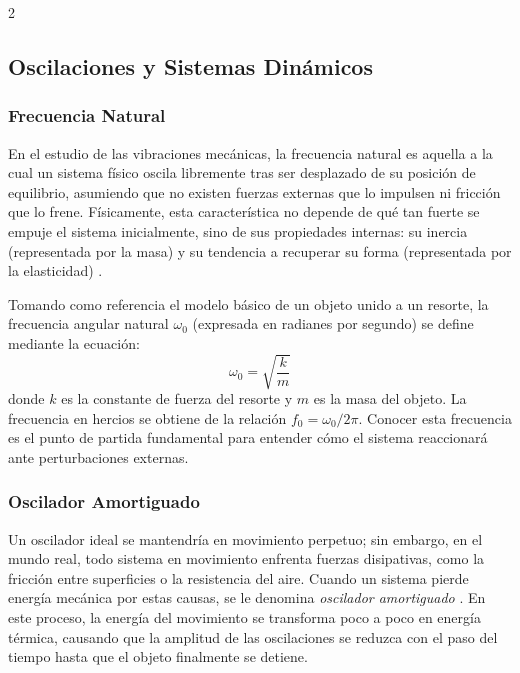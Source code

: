 \documentclass[10pt]{article}
\begin{document}
\begin{multicols}{2}
\subsection{Oscilaciones y Sistemas Dinámicos}

\subsubsection{Frecuencia Natural}
En el estudio de las vibraciones mecánicas, la frecuencia natural es aquella a la cual un sistema físico oscila libremente tras ser desplazado de su posición de equilibrio, asumiendo que no existen fuerzas externas que lo impulsen ni fricción que lo frene. Físicamente, esta característica no depende de qué tan fuerte se empuje el sistema inicialmente, sino de sus propiedades internas: su inercia (representada por la masa) y su tendencia a recuperar su forma (representada por la elasticidad) \cite{sears_zemansky}.

Tomando como referencia el modelo básico de un objeto unido a un resorte, la frecuencia angular natural $\omega_0$ (expresada en radianes por segundo) se define mediante la ecuación:
\begin{equation}
    \omega_0 = \sqrt{\frac{k}{m}}
\end{equation}
donde $k$ es la constante de fuerza del resorte y $m$ es la masa del objeto. La frecuencia en hercios se obtiene de la relación $f_0 = \omega_0 / 2\pi$. Conocer esta frecuencia es el punto de partida fundamental para entender cómo el sistema reaccionará ante perturbaciones externas.

\subsubsection{Oscilador Amortiguado}
Un oscilador ideal se mantendría en movimiento perpetuo; sin embargo, en el mundo real, todo sistema en movimiento enfrenta fuerzas disipativas, como la fricción entre superficies o la resistencia del aire. Cuando un sistema pierde energía mecánica por estas causas, se le denomina \textit{oscilador amortiguado} \cite{sears_zemansky}. En este proceso, la energía del movimiento se transforma poco a poco en energía térmica, causando que la amplitud de las oscilaciones se reduzca con el paso del tiempo hasta que el objeto finalmente se detiene.


\end{multicols}
\end{document}

